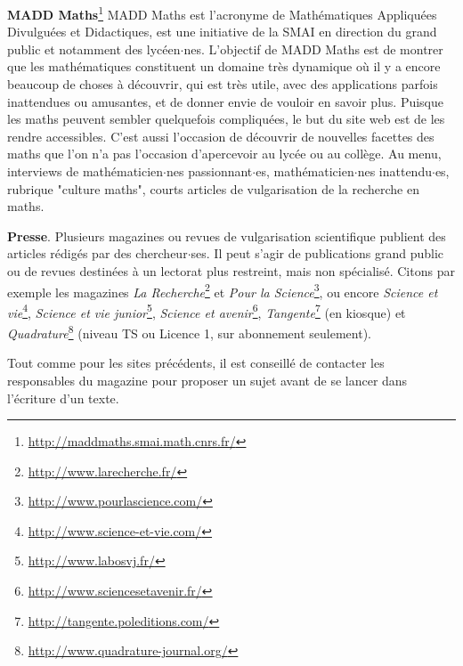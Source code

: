 \medskip\par
\textbf{MADD Maths}\footnote{\url{http://maddmaths.smai.math.cnrs.fr/}}  MADD Maths est l'acronyme de Math\'ematiques Appliqu\'ees Divulgu\'ees et Didactiques, est une initiative de la SMAI en direction du grand public et notamment des lyc\'een$\cdot$nes.
L'objectif de MADD Maths est de montrer que les math\'ematiques constituent un domaine tr\`es dynamique o\`u il y a encore beaucoup de choses \`a d\'ecouvrir, qui est tr\`es utile, avec des applications parfois inattendues ou amusantes, et de donner envie de vouloir en savoir plus. Puisque les maths peuvent sembler quelquefois compliqu\'ees, le but du site web est de les rendre accessibles.
C'est aussi l'occasion de d\'ecouvrir de nouvelles facettes des maths que l'on n'a pas l'occasion d'apercevoir au lyc\'ee ou au coll\`ege.
Au menu, interviews de math\'ematicien$\cdot$nes passionnant$\cdot$es, math\'ematicien$\cdot$nes inattendu$\cdot$es, rubrique "culture maths", courts articles de vulgarisation de la recherche en maths.

\medskip
{\bf Presse}. Plusieurs magazines ou revues de vulgarisation scientifique publient des articles r\'edig\'es par des chercheur$\cdot$ses.
Il peut s'agir de publications grand public ou de revues destin\'ees \`a un lectorat plus restreint, mais non sp\'ecialis\'e.
Citons par exemple les magazines
\textit{La Recherche}\footnote{\url{http://www.larecherche.fr/}} et
\textit{Pour la Science}\footnote{\url{http://www.pourlascience.com/}}, ou encore
\textit{Science et vie}\footnote{\url{http://www.science-et-vie.com/}},
\textit{Science et vie junior}\footnote{\url{http://www.labosvj.fr/}},
\textit{Science et avenir}\footnote{\url{http://www.sciencesetavenir.fr/}},
\textit{Tangente}\footnote{\url{http://tangente.poleditions.com/}} (en kiosque)
et \textit{Quadrature}\footnote{\url{http://www.quadrature-journal.org/}}
(niveau TS ou Licence 1, sur abonnement seulement).

Tout comme pour les sites pr\'ec\'edents, il est conseill\'e de contacter les responsables du
 magazine pour proposer un sujet avant de se lancer dans l'\'ecriture d'un texte.


